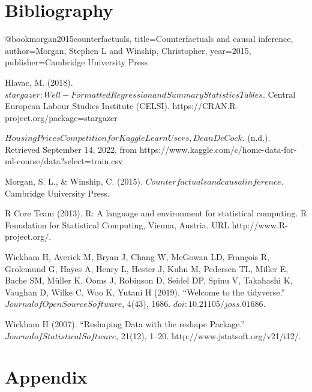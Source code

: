 \documentclass[a4paper]{article}
\begin{document}
\section{Bibliography}
\begin{thebibliography}{9}

@book{morgan2015counterfactuals,
  title={Counterfactuals and causal inference},
  author={Morgan, Stephen L and Winship, Christopher},
  year={2015},
  publisher={Cambridge University Press}
}

\indent Hlavac, M. (2018). $stargazer: Well-Formatted Regression and Summary Statistics Tables.$ Central European Labour Studies Institute (CELSI). https://CRAN.R-project.org/package=stargazer

\indent $Housing Prices Competition for Kaggle Learn Users, Dean De Cock$. (n.d.). Retrieved September 14, 2022, from https://www.kaggle.com/c/home-data-for-ml-course/data?select=train.csv

\indent Morgan, S. L., \& Winship, C. (2015). $Counterfactuals and causal inference.$ Cambridge University Press.


\indent  R Core Team (2013). R: A language and environment for statistical
  computing. R Foundation for Statistical Computing, Vienna, Austria.
  URL http://www.R-project.org/.
  
\indent Wickham H, Averick M, Bryan J, Chang W, McGowan LD, François R, Grolemund G, Hayes A, Henry L, Hester J, Kuhn M, Pedersen TL, Miller E, Bache SM, Müller K, Ooms J, Robinson D, Seidel DP, Spinu V, Takahashi K, Vaughan D, Wilke C, Woo K, Yutani H (2019). “Welcome to the tidyverse.” $Journal of Open Source Software$, 4(43), 1686. $doi:10.21105/joss.01686.$

Wickham H (2007). “Reshaping Data with the reshape Package.” $Journal of Statistical Software$, 21(12), 1–20. http://www.jstatsoft.org/v21/i12/.





\end{thebibliography}

\section{Appendix}
\end{document}
